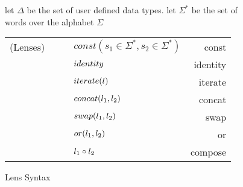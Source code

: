 

\begin{figure}

let $\Delta$ be the set of user defined data types.
let $\Sigma^*$ be the set of words over the alphabet $\Sigma$\\

\begin{tabular}{l@{\ }l@{\ }c@{\ }l@{\ }r}

(Lenses)& \Lens{} & \GEq{} & $const(s_1 \in \Sigma^*,s_2 \in \Sigma^*)$ & const \\
& & & \GBar{} $identity$ & identity\\
& & & \GBar{} $iterate(l)$ & iterate \\
& & & \GBar{} $concat(l_1,l_2)$ & concat \\
& & & \GBar{} $swap(l_1,l_2)$ & swap\\
& & & \GBar{} $or(l_1,l_2)$ & or\\
& & & \GBar{} $l_1 \circ l_2$ & compose\\
\end{tabular}
\caption{Lens Syntax}
\label{fig:lens-syntax}
\end{figure}
